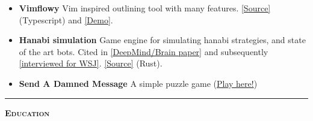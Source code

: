 \documentclass[11 pt]{article}
\begin{document}
\begin{itemize}
\item \textbf{Vimflowy}
Vim inspired outlining tool with many features. \href{https://github.com/WuTheFWasThat/vimflowy}{[Source]} (Typescript) and \href{https://wuthejeff.com/vimflowy}{[Demo]}.

\item \textbf{Hanabi simulation}
  Game engine for simulating hanabi strategies, and state of the art bots.  Cited in \href{https://arxiv.org/abs/1902.00506}{[DeepMind/Brain paper]} and subsequently \href{https://www.wsj.com/articles/why-the-card-game-hanabi-is-the-next-big-hurdle-for-artificial-intelligence-11553875351?mod=rsswn}{[interviewed for WSJ]}. \href{https://github.com/WuTheFWasThat/hanabi.rs}{[Source]} (Rust).



\item \textbf{Send A Damned Message}
A simple puzzle game %
(\href{https://www.wuthejeff.com/send-a-damned-message}{Play here!})




\end{itemize}

\hrule

\begin{center}\begin{Large}\textsc{\textbf{Education}\\}\end{Large}
\end{center}
\end{document}

